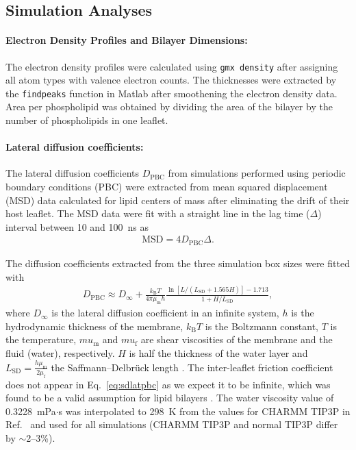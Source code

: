 \documentclass[aps,prl,superscriptaddress]{revtex4-2}
\begin{document}
\subsection{Simulation Analyses}

\paragraph{Electron Density Profiles and Bilayer Dimensions:} The electron density profiles were calculated using \texttt{gmx density} after assigning all atom types with valence electron counts. The thicknesses were extracted by the \texttt{findpeaks} function in Matlab after smoothening the electron density data. Area per phospholipid was obtained by dividing the area of the bilayer by the number of phospholipids in one leaflet. 

\paragraph{Lateral diffusion coefficients:} The lateral diffusion coefficients $D_\mathrm{PBC}$ from simulations performed using periodic boundary conditions (PBC) were extracted from mean squared displacement (MSD) data calculated for lipid centers of mass after eliminating the drift of their host leaflet. The MSD data were fit with a straight line in the lag time ($\Delta$) interval between 10 and 100~ns as
%
\begin{align}
	\mathrm{MSD}=4D_\mathrm{PBC}\Delta.
\end{align}

The diffusion coefficients extracted from the three simulation box sizes were fitted with
%
\begin{align}
	D_\mathrm{PBC}\approx D_\infty+\frac{k_\mathrm{B}T}{4\pi\mu_\mathrm{m}h}\frac{\ln\left[L/\left(L_\mathrm{SD}+1.565H\right)\right]-1.713}{1+H/L_\mathrm{SD}},
	\label{eq:sdlatpbc}
\end{align}
%
where $D_\infty$ is the lateral diffusion coefficient in an infinite system, $h$ is the hydrodynamic thickness of the membrane, $k_\mathrm{B}T$ is the Boltzmann constant, $T$ is the temperature, $mu_\mathrm{m}$ and $mu_\mathrm{f}$ are shear viscosities of the membrane and the fluid (water), respectively. $H$ is half the thickness of the water layer and $L_\mathrm{SD}=\frac{h\mu_\mathrm{m}}{2\mu_\mathrm{f}}$ the Saffmann--Delbr\"{u}ck length \cite{vogele2018hydrodynamics}. The inter-leaflet friction coefficient does not appear in Eq.~\eqref{eq:sdlatpbc} as we expect it to be infinite, which was found to be a valid assumption for lipid bilayers \cite{vogele2018hydrodynamics}. The water viscosity value of 0.3228~mPa$\cdot$s was interpolated to 298~K from the values for CHARMM TIP3P in Ref.~ and used for all simulations (CHARMM TIP3P and normal TIP3P differ by $\sim$2--3\%).
\end{document}

